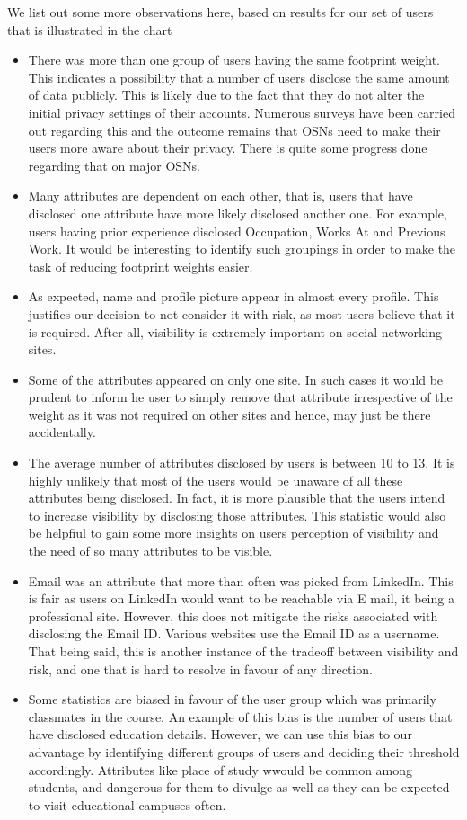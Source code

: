 \documentclass[10pt,conference]{IEEEtran}
\begin{document}
We list out some more observations here, based on results for our set of users that is illustrated in the chart
\begin{itemize}
\item There was more than one group of users having the same footprint weight. This indicates a possibility that a number of users disclose the same amount of data publicly. This is likely due to the fact that they do not alter the initial privacy settings of their accounts. Numerous surveys have been carried out regarding this and the outcome remains that OSNs need to make their users more aware about their privacy. There is quite some progress done regarding that on major OSNs.
\item Many attributes are dependent on each other, that is, users that have disclosed one attribute have more likely disclosed another one. For example, users having prior experience disclosed Occupation, Works At and Previous Work. It would be interesting to identify such groupings in order to make the task of reducing footprint weights easier.
\item As expected, name and profile picture appear in almost every profile. This justifies our decision to not consider it with risk, as most users believe that it is required. After all, visibility is extremely important on social networking sites.
\item Some of the attributes appeared on only one site. In such cases it would be prudent to inform he user to simply remove that attribute irrespective of the weight as it was not required on other sites and hence, may just be there accidentally.
\item The average number of attributes disclosed by users is between 10 to 13. It is highly unlikely that most of the users would be unaware of all these attributes being disclosed. In fact, it is more plausible that the users intend to increase visibility by disclosing those attributes. This statistic would also be helpfiul to gain some more insights on users perception of visibility and the need of so many attributes to be visible.
\item Email was an attribute that more than often was picked from LinkedIn. This is fair as users on LinkedIn would want to be reachable via E mail, it being a professional site. However, this does not mitigate the risks associated with disclosing the Email ID. Various websites use the Email ID as a username. That being said, this is another instance of the tradeoff between visibility and risk, and one that is hard to resolve in favour of any direction.
\item Some statistics are biased in favour of the user group which was primarily classmates in the course. An example of this bias is the number of users that have disclosed education details. However, we can use this bias to our advantage by identifying different groups of users and deciding their threshold accordingly. Attributes like place of study wwould be common among students, and dangerous for them to divulge as well as they can be expected to visit educational campuses often.\\
\end{itemize}
\end{document}
